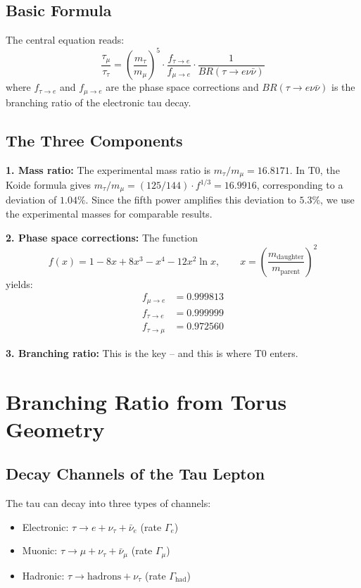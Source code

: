 	\subsection{Basic Formula}
	
	The central equation reads:
	\begin{equation}
		\frac{\tau_\mu}{\tau_\tau} = \left(\frac{m_\tau}{m_\mu}\right)^5 \cdot \frac{f_{\tau \to e}}{f_{\mu \to e}} \cdot \frac{1}{BR(\tau \to e \nu \bar\nu)}
		\label{eq:lifetime-ratio}
	\end{equation}
	where $f_{\tau \to e}$ and $f_{\mu \to e}$ are the phase space corrections and $BR(\tau \to e \nu \bar\nu)$ is the branching ratio of the electronic tau decay.
	
	\subsection{The Three Components}
	
	\textbf{1. Mass ratio:} The experimental mass ratio is $m_\tau/m_\mu = 16.8171$. In T0, the Koide formula gives $m_\tau/m_\mu = (125/144) \cdot f^{1/3} = 16.9916$, corresponding to a deviation of $1.04\%$. Since the fifth power amplifies this deviation to $5.3\%$, we use the experimental masses for comparable results.
	
	\textbf{2. Phase space corrections:} The function
	\begin{equation}
		f(x) = 1 - 8x + 8x^3 - x^4 - 12 x^2 \ln x, \qquad x = \left(\frac{m_\text{daughter}}{m_\text{parent}}\right)^2
	\end{equation}
	yields:
	\begin{align}
		f_{\mu \to e} &= 0.999813 \\
		f_{\tau \to e} &= 0.999999 \\
		f_{\tau \to \mu} &= 0.972560
	\end{align}
	
	\textbf{3. Branching ratio:} This is the key -- and this is where T0 enters.
	
	
	\section{Branching Ratio from Torus Geometry}
	
	\subsection{Decay Channels of the Tau Lepton}
	
	The tau can decay into three types of channels:
	\begin{itemize}
		\item Electronic: $\tau \to e + \nu_\tau + \bar\nu_e$ (rate $\Gamma_e$)
		\item Muonic: $\tau \to \mu + \nu_\tau + \bar\nu_\mu$ (rate $\Gamma_\mu$)
		\item Hadronic: $\tau \to \text{hadrons} + \nu_\tau$ (rate $\Gamma_\text{had}$)
	\end{itemize}
	
